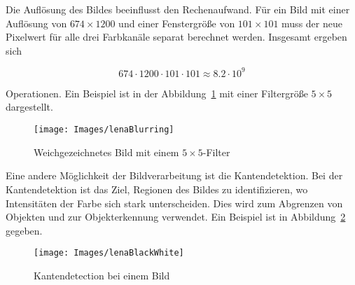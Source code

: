 Die Auflösung des Bildes beeinflusst den Rechenaufwand. Für ein Bild mit einer
Auflösung von $674 \times 1200$ und einer Fenstergröße von $101 \times 101$ muss der neue Pixelwert für alle drei Farbkanäle separat berechnet werden. Insgesamt ergeben sich

$$674 \cdot 1200 \cdot 101 \cdot 101 \approx 8.2 \cdot 10^9$$

Operationen. Ein Beispiel ist in der Abbildung~\ref{Bild:Blurring} mit einer Filtergröße $5 \times 5$ dargestellt.


\begin{figure}
  \centering
  
  \texttt{[image: Images/lenaBlurring]}

  \caption{Weichgezeichnetes Bild mit einem $5 \times 5$-Filter}\label{Bild:Blurring}
\end{figure}


Eine andere Möglichkeit der Bildverarbeitung ist die Kantendetektion. Bei der Kantendetektion ist das Ziel, Regionen des Bildes zu identifizieren, wo Intensitäten der Farbe sich stark unterscheiden. Dies wird zum Abgrenzen von Objekten und zur
Objekterkennung verwendet. Ein Beispiel ist in Abbildung~\ref{Bild:Kanten} gegeben.

%
%

\begin{figure}
	\centering
	
	\texttt{[image: Images/lenaBlackWhite]}
	
	\caption{Kantendetection bei einem Bild}\label{Bild:Kanten}
\end{figure}





%                
%        
%        
%        

